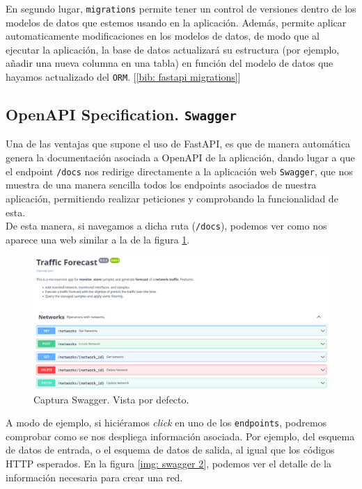 \documentclass[a4paper, oneside, 12pt]{book}
\begin{document}
	\noindent En segundo lugar, \texttt{migrations} permite tener un control de versiones dentro de los modelos de datos que estemos usando en la aplicación. Además, permite aplicar automaticamente modificaciones en los modelos de datos, de modo que al ejecutar la aplicación, la base de datos actualizará su estructura (por ejemplo, añadir una nueva columna en una tabla) en función del modelo de datos que hayamos actualizado del \texttt{ORM}. [\ref{bib: fastapi migrations}]
	
	\pagebreak
	
	\subsection{OpenAPI Specification. \texttt{Swagger}}
	
	\noindent Una de las ventajas que supone el uso de FastAPI, es que de manera automática genera la documentación asociada a OpenAPI de la aplicación, dando lugar a que el endpoint \texttt{/docs} nos redirige directamente a la aplicación web \texttt{Swagger}, que nos muestra de una manera sencilla todos los endpoints asociados de nuestra aplicación, permitiendo realizar peticiones y comprobando la funcionalidad de esta. \\
	
	\noindent De esta manera, si navegamos a dicha ruta (\texttt{/docs}), podemos ver como nos aparece una web similar a la de la figura \ref{img: swagger 1}.
	
	\begin{figure}[h!]
		\includegraphics[width=1.2\textwidth,center]{img/swagger_1.png}
		\caption{Captura Swagger. Vista por defecto.}
		\label{img: swagger 1}
	\end{figure}

	\noindent A modo de ejemplo, si hiciéramos \textit{click} en uno de los \texttt{endpoints}, podremos comprobar como se nos despliega información asociada. Por ejemplo, del esquema de datos de entrada, o el esquema de datos de salida, al igual que los códigos HTTP esperados. En la figura \ref{img: swagger 2}, podemos ver el detalle de la información necesaria para crear una red. \\
	
\end{document}
